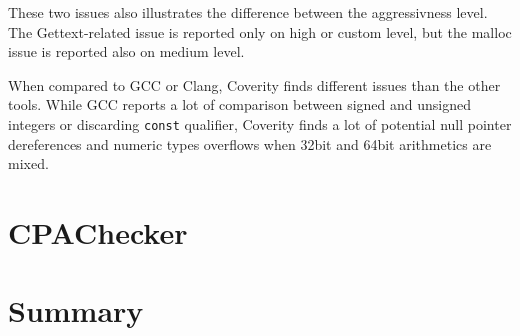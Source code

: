 These two issues also illustrates the difference between the aggressivness
level. The Gettext-related issue is reported only on high or custom level, but
the malloc issue is reported also on medium level.

When compared to GCC or Clang, Coverity finds different issues than the other
tools. While GCC reports a lot of comparison between signed and unsigned
integers or discarding {\tt const} qualifier, Coverity finds a lot of potential
null pointer dereferences and numeric types overflows when 32bit and 64bit
arithmetics are mixed.

\section{CPAChecker}\label{chap:results:cpachecker}

\section{Summary}\label{chap:results:summary}

